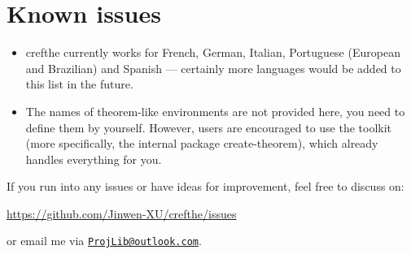 \documentclass[classical]{einfart}
\newcommand{\crefthepackage}{\textsf{crefthe}}
\begin{document}
\bigskip
\section{Known issues}
\begin{itemize}
    \item \crefthepackage{} currently works for French, German, Italian, Portuguese (European and Brazilian) and Spanish --- certainly more languages would be added to this list in the future.
    \item The names of theorem-like environments are not provided here, you need to define them by yourself. However, users are encouraged to use the \ProjLib{} toolkit (more specifically, the internal package \textsf{create-theorem}), which already handles everything for you.
\end{itemize}

\medskip
If you run into any issues or have ideas for improvement, feel free to discuss on:
\begin{center}
    \url{https://github.com/Jinwen-XU/crefthe/issues}
\end{center}
or email me via \href{mailto:ProjLib@outlook.com}{\texttt{ProjLib@outlook.com}}.
\end{document}
